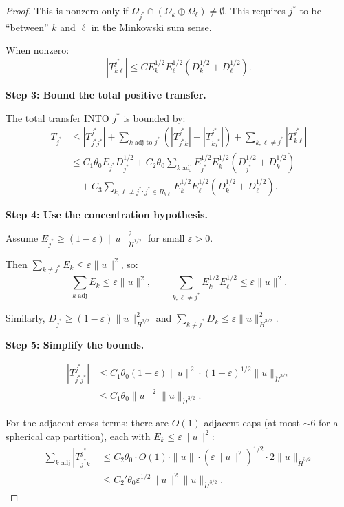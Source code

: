 \documentclass[11pt]{article}
\theoremstyle{definition}
\begin{document}
\begin{proof}
This is nonzero only if $\Omega_{j^*} \cap (\Omega_k \oplus \Omega_\ell) \neq \emptyset$. This requires $j^*$ to be ``between'' $k$ and $\ell$ in the Minkowski sum sense.

When nonzero:
\begin{equation}
|T_{k\ell}^{j^*}| \leq C E_k^{1/2} E_\ell^{1/2} (D_k^{1/2} + D_\ell^{1/2}).
\end{equation}

\textbf{Step 3: Bound the total positive transfer.}

The total transfer INTO $j^*$ is bounded by:
\begin{align}
T_{j^*} &\leq |T_{j^* j^*}^{j^*}| + \sum_{k \text{ adj to } j^*} (|T_{j^* k}^{j^*}| + |T_{k j^*}^{j^*}|) + \sum_{k, \ell \neq j^*} |T_{k\ell}^{j^*}| \\
&\leq C_1\theta_0 E_{j^*} D_{j^*}^{1/2} + C_2 \theta_0 \sum_{k \text{ adj}} E_{j^*}^{1/2} E_k^{1/2}(D_{j^*}^{1/2} + D_k^{1/2}) \\
&\quad + C_3 \sum_{k, \ell \neq j^*: j^* \in R_{k\ell}} E_k^{1/2} E_\ell^{1/2} (D_k^{1/2} + D_\ell^{1/2}).
\end{align}

\textbf{Step 4: Use the concentration hypothesis.}

Assume $E_{j^*} \geq (1-\varepsilon)\|u\|_{\dot{H}^{1/2}}^2$ for small $\varepsilon > 0$.

Then $\sum_{k \neq j^*} E_k \leq \varepsilon \|u\|^2$, so:
\begin{equation}
\sum_{k \text{ adj}} E_k \leq \varepsilon \|u\|^2, \qquad \sum_{k, \ell \neq j^*} E_k^{1/2} E_\ell^{1/2} \leq \varepsilon \|u\|^2.
\end{equation}

Similarly, $D_{j^*} \geq (1-\varepsilon)\|u\|_{\dot{H}^{3/2}}^2$ and $\sum_{k \neq j^*} D_k \leq \varepsilon \|u\|_{\dot{H}^{3/2}}^2$.

\textbf{Step 5: Simplify the bounds.}

\begin{align}
|T_{j^* j^*}^{j^*}| &\leq C_1 \theta_0 (1-\varepsilon) \|u\|^2 \cdot (1-\varepsilon)^{1/2} \|u\|_{\dot{H}^{3/2}} \\
&\leq C_1 \theta_0 \|u\|^2 \|u\|_{\dot{H}^{3/2}}.
\end{align}

For the adjacent cross-terms: there are $O(1)$ adjacent caps (at most $\sim 6$ for a spherical cap partition), each with $E_k \leq \varepsilon\|u\|^2$:
\begin{align}
\sum_{k \text{ adj}} |T_{j^* k}^{j^*}| &\leq C_2 \theta_0 \cdot O(1) \cdot \|u\| \cdot (\varepsilon\|u\|^2)^{1/2} \cdot 2\|u\|_{\dot{H}^{3/2}} \\
&\leq C_2' \theta_0 \varepsilon^{1/2} \|u\|^2 \|u\|_{\dot{H}^{3/2}}.
\end{align}


\end{proof}
\end{document}
